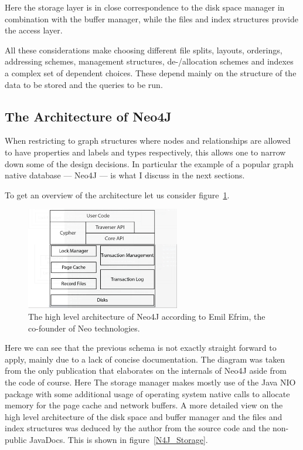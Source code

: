 \documentclass[a4paper,10pt]{article}
\begin{document}
        Here the storage layer is in close correspondence to the disk space manager in combination with the buffer manager, while the files and index structures provide the access layer.

        All these considerations make choosing different file splits, layouts, orderings, addressing schemes, management structures, de-/allocation schemes and indexes a complex set of dependent choices. 
        These depend mainly on the structure of the data to be stored and the queries to be run. 

    \subsection{The Architecture of Neo4J}
        When restricting to graph structures where nodes and relationships are allowed to have properties and labels and types respectively, this allows one to narrow down some of the design decisions.
        In particular the example of a popular graph native database --- Neo4J --- is what I discuss in the next sections. 

        To get an overview of the architecture let us consider figure~\ref{N4J_HLA_Emil}. 

        \begin{figure}[htp]\label{N4J_HLA_Emil}
        \begin{center}
        \includegraphics[keepaspectratio,width=0.6\textwidth]{img/00_intro/N4J_HLA_Emil.png}
        \end{center}
        \caption{The high level architecture of Neo4J according to Emil Efrim, the co-founder of Neo technologies.} %
        \end{figure}

        Here we can see that the previous schema is not exactly straight forward to apply, mainly due to a lack of concise documentation.
        The diagram was taken from the only publication that elaborates on the internals of Neo4J aside from the code of course.
        Here The storage manager makes mostly use of the Java NIO package with some additional usage of operating system native calls to allocate memory for the page cache and network buffers. 
        A more detailed view on the high level architecture of the disk space and buffer manager and the files and index structures was deduced by the author from the source code and the non-public JavaDocs.
        This is shown in figure~\ref{N4J_Storage}.
\end{document}
